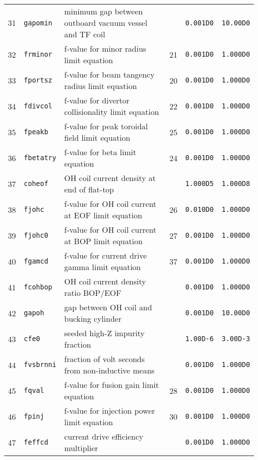 \documentclass[11pt,a4paper]{report}
\begin{document}
\begin{table}[tbph]
\begin{center}
\begin{tabular}{||c|l|l|c|c|c||}
31  & \texttt{gapomin}  & minimum gap between outboard vacuum vessel and TF coil &     & \texttt{0.001D0} & \texttt{10.00D0} \\
32  & \texttt{frminor}  & f-value for minor radius limit equation       & 21  & \texttt{0.001D0} & \texttt{1.000D0} \\
33  & \texttt{fportsz}  & f-value for beam tangency radius limit equation & 20  & \texttt{0.001D0} & \texttt{1.000D0} \\
34  & \texttt{fdivcol}  & f-value for divertor collisionality limit equation & 22  & \texttt{0.001D0} & \texttt{1.000D0} \\
35  & \texttt{fpeakb}   & f-value for peak toroidal field limit equation & 25  & \texttt{0.001D0} & \texttt{1.000D0} \\
36  & \texttt{fbetatry} & f-value for beta limit equation               & 24  & \texttt{0.001D0} & \texttt{1.000D0} \\
37  & \texttt{coheof}   & OH coil current density at end of flat-top    &     & \texttt{1.000D5} & \texttt{1.000D8} \\
38  & \texttt{fjohc}    & f-value for OH coil current at EOF limit equation & 26  & \texttt{0.010D0} & \texttt{1.000D0} \\
39  & \texttt{fjohc0}   & f-value for OH coil current at BOP limit equation & 27  & \texttt{0.001D0} & \texttt{1.000D0} \\
40  & \texttt{fgamcd}   & f-value for current drive gamma limit equation & 37  & \texttt{0.001D0} & \texttt{1.000D0} \\
41  & \texttt{fcohbop}  & OH coil current density ratio BOP/EOF         &     & \texttt{0.001D0} & \texttt{1.000D0} \\
42  & \texttt{gapoh}    & gap between OH coil and bucking cylinder      &     & \texttt{0.001D0} & \texttt{10.00D0} \\
43  & \texttt{cfe0}     & seeded high-Z impurity fraction               &     & \texttt{1.00D-6} & \texttt{3.00D-3} \\
44  & \texttt{fvsbrnni} & fraction of volt seconds from non-inductive means &     & \texttt{0.001D0} & \texttt{1.000D0} \\
45  & \texttt{fqval}    & f-value for fusion gain limit equation        & 28  & \texttt{0.001D0} & \texttt{1.000D0} \\
46  & \texttt{fpinj}    & f-value for injection power limit equation    & 30  & \texttt{0.001D0} & \texttt{1.000D0} \\
47  & \texttt{feffcd}   & current drive efficiency multiplier           &     & \texttt{0.001D0} & \texttt{1.000D0} \\

\end{tabular}
\end{center}
\end{table}
\end{document}
